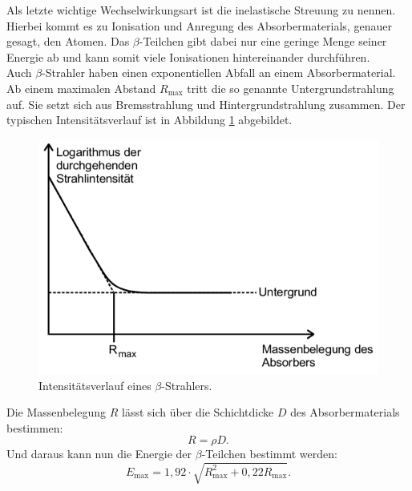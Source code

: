 Als letzte wichtige Wechselwirkungsart ist die inelastische Streuung zu nennen. Hierbei kommt es zu Ionisation und Anregung des Absorbermaterials, genauer gesagt, den Atomen. Das $\beta$-Teilchen gibt dabei nur eine geringe Menge seiner Energie ab und kann somit viele Ionisationen hintereinander durchführen.
\\
Auch $\beta$-Strahler haben einen exponentiellen Abfall an einem Absorbermaterial. Ab einem maximalen Abstand $R_\text{max}$ tritt die so genannte Untergrundstrahlung auf. Sie setzt sich aus Bremsstrahlung und Hintergrundstrahlung zusammen. Der typischen Intensitätsverlauf ist in Abbildung \ref{fig:BetaVerlauf} abgebildet. 
\begin{figure}[H]
    \centering
    \includegraphics[scale=0.7]{Theorie/BetaVerlauf.pdf}
    \caption{Intensitätsverlauf eines $\beta$-Strahlers.}
    \label{fig:BetaVerlauf}
\end{figure}
Die Massenbelegung $R$ lässt sich über die Schichtdicke $D$ des Absorbermaterials bestimmen:
\begin{equation}
	R = \rho D .
\end{equation}
Und daraus kann nun die Energie der $\beta$-Teilchen bestimmt werden:
\begin{equation}
	E_\text{max} = 1,92 \cdot \sqrt{R^2_\text{max} + 0,22 R_\text{max}} .
\end{equation}